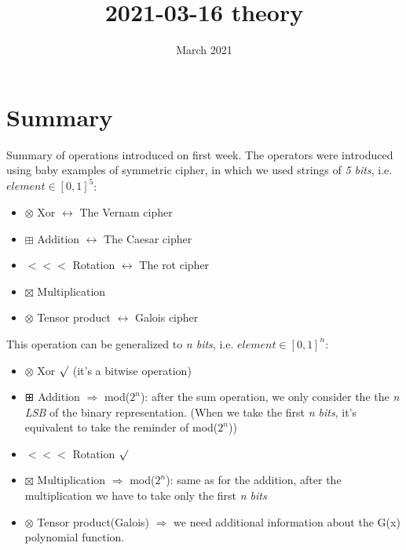 \documentclass{article}
\title{2021-03-16 theory}
\author{}
\date{March 2021}
\begin{document}
\maketitle
\section*{Summary}
Summary of operations introduced on first week. The operators were introduced using baby examples of symmetric cipher, in which we used strings of \textit{5 bits}, i.e. $element \in [0,1]^5$:
\begin{itemize}
\item  $\otimes$ Xor \(\longleftrightarrow\) The Vernam cipher
\item  $\boxplus$ Addition \(\longleftrightarrow\) The Caesar cipher
\item $<<<$ Rotation \(\longleftrightarrow\) The rot cipher 
\item $\boxtimes$ Multiplication
\item  $\otimes$ Tensor product \(\longleftrightarrow\) Galois cipher  
\end{itemize}
This operation can be generalized to \textit{n bits}, i.e. $element \in [0,1]^n$:
\begin{itemize}
\item  $\otimes$ Xor  \(\surd\) (it's a bitwise operation)
\item   ⊞  Addition \(\Rightarrow\) mod($2^{n}$): after the sum operation, we only consider the the \textit{n LSB} of the  binary representation. (When we take the first \textit{n bits}, it's equivalent to take the reminder of mod($2^{n}$))
\item $<<<$ Rotation \(\surd\)
\item $\boxtimes$ Multiplication \(\Rightarrow\) mod($2^{n}$): same as for the addition, after the multiplication we have to take only the first \textit{n bits}
\item $\otimes$ Tensor product(Galois) \(\Rightarrow\) we need additional information about the G(x) polynomial function. 
\end{itemize}

\newpage
\end{document}
